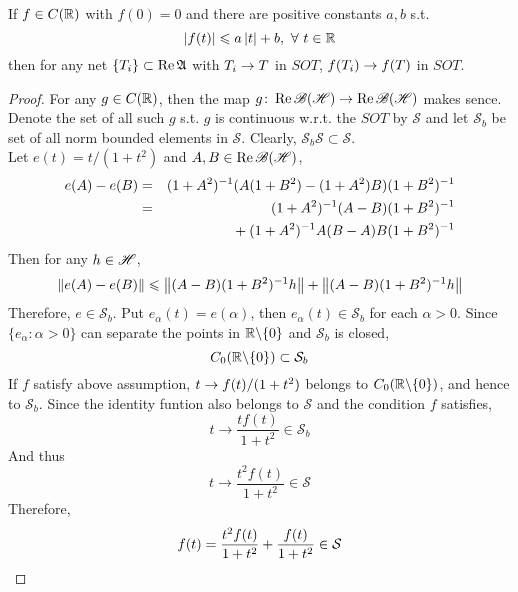 \begin{lem}
	If $f \in C(\mathbb{R})$ with $f(0)=0$ and there are positive constants $a,b$ s.t. 
	\begin{equation*}
		\left\lvert f(t)\right\lvert \leqslant a\left\lvert t\right\lvert + b,~ \forall~ t \in \mathbb{R}
	\end{equation*}
	then for any net $\{T_i\} \subset \operatorname{Re}{\mathfrak{A}}$ with $T_i \rightarrow T$ in $SOT$, $f(T_i) \rightarrow f(T)$ in $SOT$.
\end{lem}
\begin{proof}
	For any $g \in C(\mathbb{R})$, then the map $g \colon \operatorname{Re}{\mathscr{B(H)}} \rightarrow \operatorname{Re}{\mathscr{B(H)}}$ makes sence. Denote the set of all such $g$ s.t. $g$ is continuous w.r.t. the $SOT$ by $\mathcal{S}$ and let $\mathcal{S}_b$ be set of all norm bounded elements in $\mathcal{S}$. Clearly, $\mathcal{S}_b \mathcal{S} \subset \mathcal{S}$.\\
	Let $e(t) = t / (1+t^2)$ and $A,B \in \operatorname{Re}{\mathscr{B(H)}}$,
	\begin{eqnarray*}
		e(A)-e(B) &=& (1+A^2)^{-1}(A(1+B^2)-(1+A^2)B)(1+B^2)^{-1} \\
		&=& (1+A^2)^{-1}(A-B)(1+B^2)^{-1} \\
		&& \negmedspace{} + (1+A^2)^{-1}A(B-A)B(1+B^2)^{-1}
	\end{eqnarray*}
	Then for any $h \in \mathscr{H}$,
	\begin{equation*}
		\left\lVert e(A)-e(B)\right\lVert \leqslant \left\lVert(A-B)(1+B^2)^{-1}h\right\lVert + \left\lVert(A-B)(1+B^2)^{-1}h\right\lVert
	\end{equation*}
	Therefore, $e \in \mathcal{S}_b$. Put $e_{\alpha}(t) = e(\alpha)$, then $e_{\alpha}(t) \in \mathcal{S}_b$ for each $\alpha > 0$. Since $\{e_{\alpha} \colon \alpha > 0\}$ can separate the points in $\mathbb{R} \backslash \{0\}$ and $\mathcal{S}_b$ is closed,
	\begin{equation*}
		C_0(\mathbb{R} \backslash \{0\}) \subset \mathcal{S}_b
	\end{equation*}
	If $f$ satisfy above assumption, $t \rightarrow f(t) / (1+t^2)$ belongs to $C_0(\mathbb{R} \backslash \{0\})$, and hence to $\mathcal{S}_b$. Since the identity funtion also belongs to $\mathcal{S}$ and the condition $f$ satisfies,
	\begin{equation*}
		t \longrightarrow \frac{tf(t)}{1+t^2} \in \mathcal{S}_b
	\end{equation*}
	And thus 
	\begin{equation*}
		t \longrightarrow \frac{t^2f(t)}{1+t^2} \in \mathcal{S}
	\end{equation*}
	Therefore,
	\begin{equation*}
		f(t) = \frac{t^2f(t)}{1+t^2} + \frac{f(t)}{1+t^2} \in \mathcal{S} \qedhere
	\end{equation*}
\end{proof}

